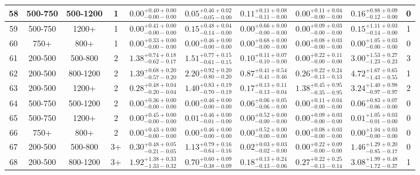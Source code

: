 \documentclass[11pt, oneside]{article}   	%
\begin{document}
\begin{table}
{\begin{tabular}{ |c|c|c|c||c|c|c|c||c|c| }
58 & 500-750 & 500-1200 & 1 & $0.00^{+0.40+0.00}_{-0.00-0.00}$ & $0.05^{+0.46+0.02}_{-0.05-0.00}$ & $0.11^{+0.11+0.08}_{-0.11-0.00}$ & $0.00^{+0.11+0.04}_{-0.00-0.00}$ & $0.16^{+0.88+0.09}_{-0.12-0.00}$ & 0 \\ \hline
59 & 500-750 & 1200+ & 1 & $0.00^{+0.41+0.00}_{-0.00-0.00}$ & $0.15^{+0.48+0.04}_{-0.14-0.00}$ & $0.00^{+0.66+0.00}_{-0.00-0.00}$ & $0.00^{+0.09+0.03}_{-0.00-0.00}$ & $0.15^{+1.11+0.03}_{-0.14-0.00}$ & 1 \\ \hline
60 & 750+ & 800+ & 1 & $0.00^{+0.33+0.00}_{-0.00-0.00}$ & $0.00^{+0.46+0.00}_{-0.00-0.00}$ & $0.00^{+0.68+0.00}_{-0.00-0.00}$ & $0.00^{+0.08+0.03}_{-0.00-0.00}$ & $0.00^{+1.05+0.03}_{-0.00-0.00}$ & 0 \\ \hline
61 & 200-500 & 500-800 & 2 & $1.38^{+0.74+0.18}_{-0.62-0.17}$ & $1.51^{+0.77+0.15}_{-0.61-0.15}$ & $0.10^{+0.11+0.07}_{-0.10-0.00}$ & $0.00^{+0.22+0.11}_{-0.00-0.00}$ & $3.00^{+1.53+0.27}_{-1.23-0.23}$ & 3 \\ \hline
62 & 200-500 & 800-1200 & 2 & $1.39^{+0.68+0.20}_{-0.57-0.20}$ & $2.20^{+0.92+0.20}_{-0.80-0.20}$ & $0.87^{+0.41+0.54}_{-0.41-0.46}$ & $0.26^{+0.22+0.24}_{-0.13-0.13}$ & $4.72^{+1.67+0.65}_{-1.43-0.55}$ & 1 \\ \hline
63 & 200-500 & 1200+ & 2 & $0.28^{+0.48+0.04}_{-0.20-0.04}$ & $1.40^{+0.83+0.19}_{-0.70-0.19}$ & $0.17^{+0.13+0.11}_{-0.13-0.04}$ & $1.38^{+0.45+0.95}_{-0.35-0.95}$ & $3.24^{+1.40+0.98}_{-0.97-0.97}$ & 2 \\ \hline
64 & 500-750 & 500-1200 & 2 & $0.00^{+0.36+0.00}_{-0.00-0.00}$ & $0.00^{+0.46+0.00}_{-0.00-0.00}$ & $0.06^{+0.06+0.05}_{-0.06-0.00}$ & $0.00^{+0.11+0.04}_{-0.00-0.00}$ & $0.06^{+0.83+0.07}_{-0.06-0.00}$ & 0 \\ \hline
65 & 500-750 & 1200+ & 2 & $0.00^{+0.45+0.00}_{-0.00-0.00}$ & $0.01^{+0.46+0.00}_{-0.01-0.00}$ & $0.00^{+0.52+0.00}_{-0.00-0.00}$ & $0.00^{+0.09+0.03}_{-0.00-0.00}$ & $0.01^{+1.05+0.03}_{-0.01-0.00}$ & 0 \\ \hline
66 & 750+ & 800+ & 2 & $0.00^{+0.43+0.00}_{-0.00-0.00}$ & $0.00^{+0.46+0.00}_{-0.00-0.00}$ & $0.00^{+0.52+0.00}_{-0.00-0.00}$ & $0.00^{+0.08+0.03}_{-0.00-0.00}$ & $0.00^{+1.04+0.03}_{-0.00-0.00}$ & 0 \\ \hline
67 & 200-500 & 500-800 & 3+ & $0.30^{+0.48+0.05}_{-0.21-0.05}$ & $1.13^{+0.79+0.16}_{-0.64-0.16}$ & $0.02^{+0.03+0.03}_{-0.02-0.00}$ & $0.00^{+0.22+0.09}_{-0.00-0.00}$ & $1.46^{+1.29+0.20}_{-0.85-0.17}$ & 0 \\ \hline
68 & 200-500 & 800-1200 & 3+ & $1.92^{+1.38+0.33}_{-1.33-0.32}$ & $0.70^{+0.60+0.09}_{-0.38-0.09}$ & $0.18^{+0.13+0.24}_{-0.13-0.06}$ & $0.27^{+0.22+0.25}_{-0.13-0.14}$ & $3.08^{+1.99+0.48}_{-1.72-0.37}$ & 1 \\ \hline

\end{tabular}}
\end{table}
\end{document}
